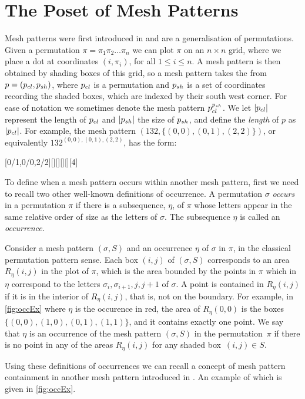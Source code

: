 \documentclass[11pt,a4paper,oneside]{article}
\begin{document}
\section{The Poset of Mesh Patterns}\label{sec:PosMP}
Mesh patterns were first introduced in \cite{Bra11} and
are a generalisation of permutations. Given a permutation
$\pi=\pi_1\pi_2\ldots\pi_n$ we can plot $\pi$ on an $n\times n$ grid,
where we place a dot at coordinates $(i,\pi_i)$, for all $1\le i\le n$.
A mesh pattern is then obtained by shading boxes of this grid, so a mesh
pattern takes the from $p=(p_{cl},p_{sh})$, where $p_{cl}$ is a permutation
and $p_{sh}$ is a set of coordinates recording the shaded boxes, which are indexed
by their south west corner. For ease of notation we sometimes denote the mesh
pattern $p_{cl}^{p_{sh}}$. We let $|p_{cl}|$ represent the length of $p_{cl}$
and $|p_{sh}|$ the size of $p_{sh}$, and define the \emph{length} of $p$ as $|p_{cl}|$.
For example, the mesh pattern $(132,\{(0,0),(0,1),(2,2)\})$,
or equivalently $132^{(0,0),(0,1),(2,2)}$, has the form:
\begin{center}
[0/1,0/0,2/2][][][][][4]
\end{center}

To define when a mesh pattern occurs within another mesh pattern, first we need to
recall two other well-known definitions of occurrence. A permutation $\sigma$
\emph{occurs} in a permutation $\pi$ if there is a subsequence, $\eta$, of $\pi$ whose letters
appear in the same relative order of size as the letters of $\sigma$. The subsequence
$\eta$ is called an \emph{occurrence}.

Consider a mesh pattern $(\sigma,S)$ and an occurrence $\eta$ of $\sigma$ in $\pi$, in the
classical permutation pattern sense. Each box $(i,j)$ of $(\sigma,S)$ corresponds to an
area $R_{\eta}(i,j)$ in the plot of $\pi$, which is the area bounded by the points in $\pi$
which in $\eta$ correspond to the letters $\sigma_i,\sigma_{i+1},j,j+1$ of $\sigma$.
A point is contained in $R_\eta(i,j)$ if it is in the interior of $R_\eta(i,j)$, that is, not on the boundary.
For example, in \cref{fig:occEx} where $\eta$ is the occurence in red, the area
of $R_\eta(0,0)$ is the boxes $\{(0,0),(1,0),(0,1),(1,1)\}$, and it contains exactly one point.
We say that $\eta$ is an occurrence of the mesh pattern $(\sigma,S)$ in the permutation~$\pi$
if there is no point in any of the areas $R_{\eta}(i,j)$ for any shaded box~$(i,j)\in S$.

Using these definitions of occurrences we can recall a concept of mesh
pattern containment in another mesh pattern introduced in \cite{TU17}.
An example of which is given in \cref{fig:occEx}.
\end{document}
